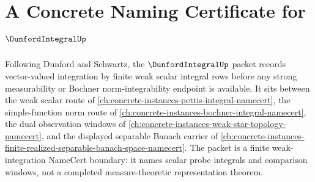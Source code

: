 \chapter{A Concrete Naming Certificate for $\DunfordIntegralUp$}
\label{ch:concrete-instances-dunford-integral-namecert}

Following Dunford and Schwartz, the $\DunfordIntegralUp$ packet records vector-valued integration by finite weak scalar integral rows before any strong measurability or Bochner norm-integrability endpoint is available. It sits between the weak scalar route of \autoref{ch:concrete-instances-pettis-integral-namecert}, the simple-function norm route of \autoref{ch:concrete-instances-bochner-integral-namecert}, the dual observation windows of \autoref{ch:concrete-instances-weak-star-topology-namecert}, and the displayed separable Banach carrier of \autoref{ch:concrete-instances-finite-realized-separable-banach-space-namecert}. The packet is a finite weak-integration NameCert boundary: it names scalar probe integrals and comparison windows, not a completed measure-theoretic representation theorem.

